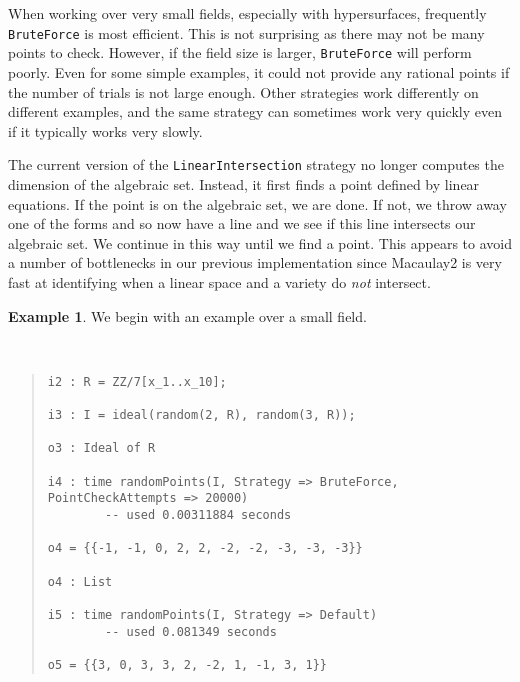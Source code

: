 \documentclass[11pt]{amsart}
\theoremstyle{definition}
\newtheorem{example}{Example}[section]
\begin{document}
    When working over very small fields, especially with hypersurfaces, frequently {\tt BruteForce} is most efficient.  This is not surprising as there may not be many points to check.  However, if the field size is larger, {\tt BruteForce} will perform poorly.  Even for some simple examples, it could not provide any rational points if the number of trials is not large enough.  Other strategies work differently on different examples, and the same strategy can sometimes work very quickly even if it typically works very slowly.  

    The current version of the {\tt LinearIntersection} strategy no longer computes the dimension of the algebraic set.  Instead, it first finds a point defined by linear equations.  If the point is on the algebraic set, we are done.  If not, we throw away one of the forms and so now have a line and we see if this line intersects our algebraic set.  We continue in this way until we find a point.  This appears to avoid a number of bottlenecks in our previous implementation since Macaulay2 is very fast at identifying when a linear space and a variety do \emph{not} intersect.  
    


    \begin{example}
        We begin with an example over a small field.
    {{\small\color{blue}
    ~~
    \begin{quote}
\begin{verbatim}
i2 : R = ZZ/7[x_1..x_10];

i3 : I = ideal(random(2, R), random(3, R));

o3 : Ideal of R

i4 : time randomPoints(I, Strategy => BruteForce, PointCheckAttempts => 20000)
        -- used 0.00311884 seconds        

o4 = {{-1, -1, 0, 2, 2, -2, -2, -3, -3, -3}}

o4 : List

i5 : time randomPoints(I, Strategy => Default)
        -- used 0.081349 seconds          

o5 = {{3, 0, 3, 3, 2, -2, 1, -1, 3, 1}}
\end{verbatim}
\end{quote}\vspace{-1em}
    }}
    \end{example}    
\end{document}

